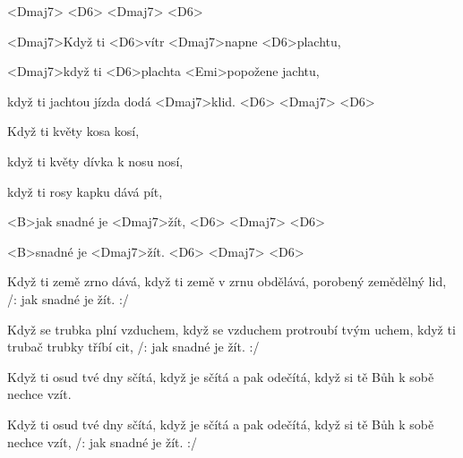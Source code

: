

<Dmaj7> <D6> <Dmaj7> <D6>

\zr
<Dmaj7>Když ti <D6>vítr <Dmaj7>napne <D6>plachtu,

<Dmaj7>když ti <D6>plachta <Emi>popožene jachtu,

když ti jachtou jízda dodá <Dmaj7>klid.
<D6> <Dmaj7> <D6>
\kr

\zs
Když ti květy kosa kosí,

když ti květy dívka k nosu nosí,

když ti rosy kapku dává pít,

<B>jak snadné je <Dmaj7>žít,
<D6>
<Dmaj7>
<D6>

<B>snadné je <Dmaj7>žít.
<D6>
<Dmaj7>
<D6>
\ks

\zr \kr

\zs
Když ti země zrno dává,
když ti země v zrnu obdělává,
porobený zemědělný lid,
/: jak snadné je žít. :/
\ks

\zr \kr

\zs
Když se trubka plní vzduchem,
když se vzduchem protroubí tvým uchem,
když ti trubač trubky tříbí cit,
/: jak snadné je žít. :/
\ks

\zs
Když ti osud tvé dny sčítá,
když je sčítá a pak odečítá,
když si tě Bůh k sobě nechce vzít.
\ks

\zs
Když ti osud tvé dny sčítá,
když je sčítá a pak odečítá,
když si tě Bůh k sobě nechce vzít,
/: jak snadné je žít. :/
\ks

\kp
